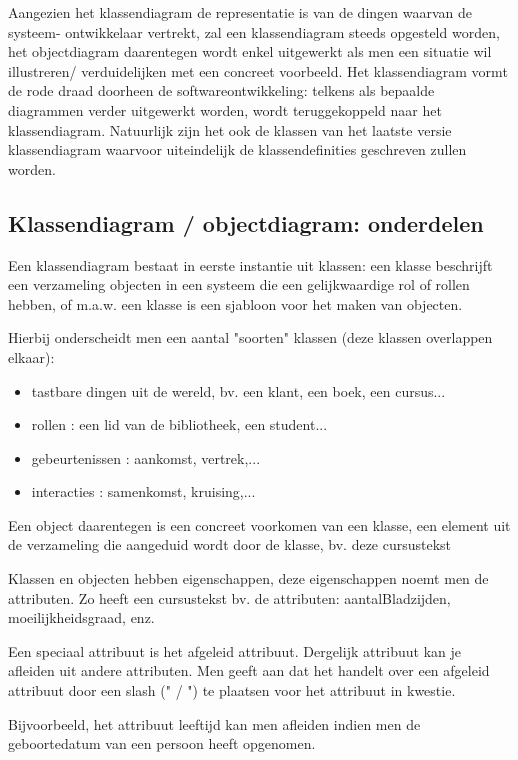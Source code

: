 Aangezien het klassendiagram de representatie is van de dingen waarvan de systeem- ontwikkelaar vertrekt, zal een klassendiagram steeds opgesteld worden, het objectdiagram daarentegen wordt enkel uitgewerkt als men een situatie wil illustreren/ verduidelijken met een concreet voorbeeld.
Het klassendiagram vormt de rode draad doorheen de softwareontwikkeling: telkens als bepaalde diagrammen verder uitgewerkt worden, wordt teruggekoppeld naar het klassendiagram. Natuurlijk zijn het ook de klassen van het laatste versie klassendiagram waarvoor uiteindelijk de klassendefinities geschreven zullen worden.
\newpage
\subsection{Klassendiagram / objectdiagram: onderdelen}

Een klassendiagram bestaat in eerste instantie uit klassen: een klasse beschrijft een verzameling objecten in een systeem die een gelijkwaardige rol of rollen hebben, of m.a.w. een klasse is een sjabloon voor het maken van objecten.

Hierbij onderscheidt men een aantal "soorten" klassen (deze klassen overlappen elkaar):

\begin{itemize}
    \item tastbare dingen uit de wereld, bv. een klant, een boek, een cursus...
    \item rollen : een lid van de bibliotheek, een student... 
    \item gebeurtenissen : aankomst, vertrek,...
    \item interacties : samenkomst, kruising,...
\end{itemize}

Een object daarentegen is een concreet voorkomen van een klasse, een element uit de verzameling die aangeduid wordt door de klasse, bv. deze cursustekst

Klassen en objecten hebben eigenschappen, deze eigenschappen noemt men de attributen. Zo heeft een cursustekst bv. de attributen: aantalBladzijden, moeilijkheidsgraad, enz.

Een speciaal attribuut is het afgeleid attribuut. Dergelijk attribuut kan je afleiden uit andere attributen. Men geeft aan dat het handelt over een afgeleid attribuut door een slash (" / ") te plaatsen voor het attribuut in kwestie.

Bijvoorbeeld, het attribuut leeftijd kan men afleiden indien men de geboortedatum van een persoon heeft opgenomen.

